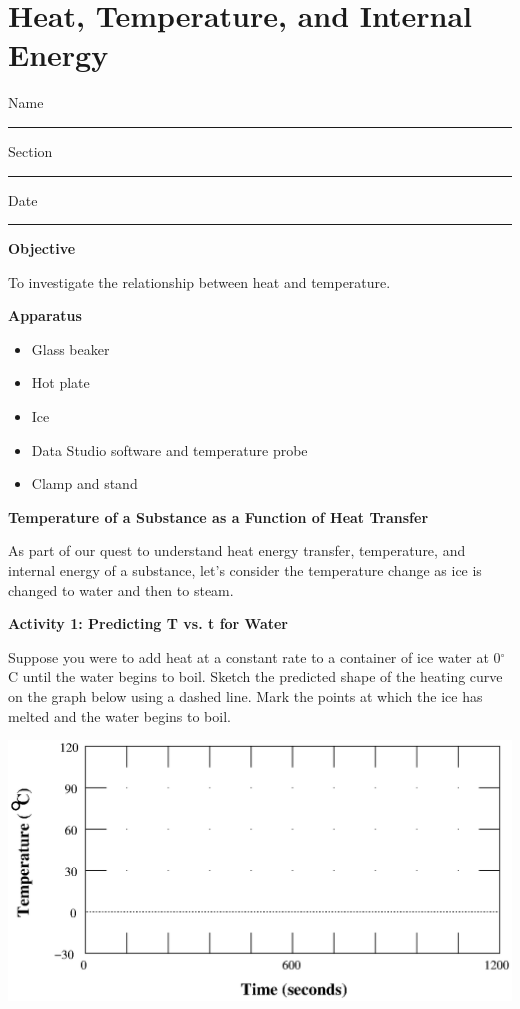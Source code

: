 
\section{Heat, Temperature, and Internal Energy}

Name \rule{2.0in}{0.1pt}\hfill{}Section \rule{1.0in}{0.1pt}\hfill{}Date
\rule{1.0in}{0.1pt}

\textbf{Objective}

To investigate the relationship between heat and temperature.

\textbf{Apparatus}

\begin{itemize}
\item Glass beaker 
\item Hot plate
\item Ice
\item Data Studio software and temperature probe
\item Clamp and stand
\end{itemize}
\textbf{Temperature of a Substance as a Function of Heat Transfer}

As part of our quest to understand heat energy transfer, temperature,
and internal energy of a substance, let's consider the temperature
change as ice is changed to water and then to steam.

\textbf{Activity 1: Predicting T vs. t for Water} 

Suppose you were to add heat at a constant rate to a container of
ice water at 0\( ^{\circ } \)C until the water begins to boil. Sketch
the predicted shape of the heating curve on the graph below using
a dashed line. Mark the points at which the ice has melted and the
water begins to boil.

\vspace{0.3cm}
{\centering \includegraphics{heat/heat_temp_int_energy_fig_1.eps} \par}
\vspace{0.3cm}


